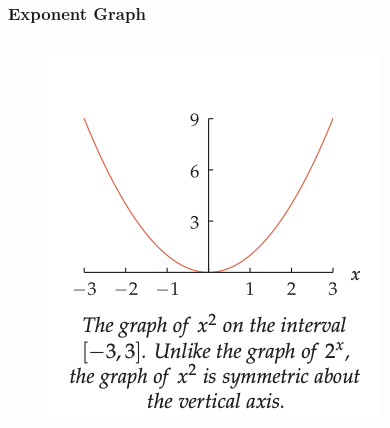 \documentclass{beamer}
\begin{document}
\begin{frame}
  \frametitle{Exponent Graph}
  \begin{columns}
    \begin{column}{0.5\textwidth}
      \begin{figure}
        \centering 
        \includegraphics[scale=0.3]{exp-vs-poly1.png}
       \end{figure}      
    \end{column}
 


\end{columns}
\end{frame}
\end{document}

